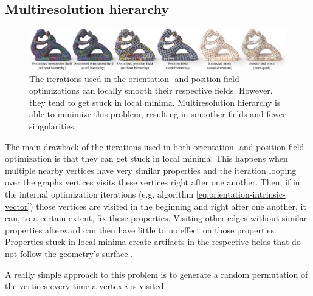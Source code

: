 \documentclass{ACGSeminar}
\begin{document}
\subsection{Multiresolution hierarchy}
\begin{figure}[htb!]
	\begin{centering}
		\includegraphics[width=\textwidth]{img/multiresolution-hierarchy.png}\par
	\end{centering}
	\caption{The iterations used in the orientation- and position-field optimizations can locally smooth their respective fields. However, they tend to get stuck in local minima. Multiresolution hierarchy is able to minimize this problem, resulting in smoother fields and fewer singularities. \cite{jakob2015instant}}
	\label{fig:multireolution-hierarchy}
\end{figure}

The main drawback of the iterations used in both orientation- and position-field optimization is that they can get stuck in local minima. This happens when multiple nearby vertices have very similar properties and the iteration looping over the graphs vertices visits these vertices right after one another. Then, if in the internal optimization iterations (e.g. algorithm \eqref{eq:orientation-intrinsic-vector}) those vertices are visited in the beginning and right after one another, it can, to a certain extent, fix these properties. Visiting other edges without similar properties afterward can then have little to no effect on those properties. Properties stuck in local minima create artifacts in the respective fields that do not follow the geometry's surface \cite{jakob2015instant}.\bigskip

A really simple approach to this problem is to generate a random permutation of the vertices every time a vertex $i$ is visited.
\end{document}
